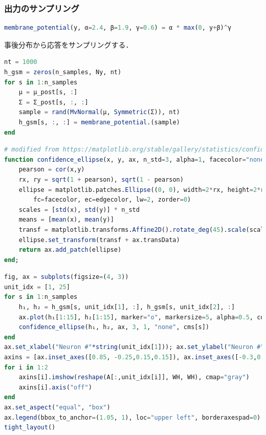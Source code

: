 \subsubsection{出力のサンプリング}
\begin{lstlisting}[language=julia]
membrane_potential(y, α=2.4, β=1.9, γ=0.6) = α * max(0, y+β)^γ
\end{lstlisting}
事後分布から応答をサンプリングする．
\begin{lstlisting}[language=julia]
nt = 1000
h_gsm = zeros(n_samples, Ny, nt)
for s in 1:n_samples
    μ = μ_post[s, :]
    Σ = Σ_post[s, :, :]
    sample = rand(MvNormal(μ, Symmetric(Σ)), nt)
    h_gsm[s, :, :] = membrane_potential.(sample)
end
\end{lstlisting}
\begin{lstlisting}[language=julia]
# modified from https://matplotlib.org/stable/gallery/statistics/confidence_ellipse.html
function confidence_ellipse(x, y, ax, n_std=3, alpha=1, facecolor="none", edgecolor="tab:gray")
    pearson = cor(x,y)
    rx, ry = sqrt(1 + pearson), sqrt(1 - pearson)
    ellipse = matplotlib.patches.Ellipse((0, 0), width=2*rx, height=2*ry, alpha=alpha, 
        fc=facecolor, ec=edgecolor, lw=2, zorder=0)
    scales = [std(x), std(y)] * n_std
    means = [mean(x), mean(y)]
    transf = matplotlib.transforms.Affine2D().rotate_deg(45).scale(scales...).translate(means...)
    ellipse.set_transform(transf + ax.transData)
    return ax.add_patch(ellipse)
end;
\end{lstlisting}
\begin{lstlisting}[language=julia]
fig, ax = subplots(figsize=(4, 3))
unit_idx = [1, 25]
for s in 1:n_samples
    h₁, h₂ = h_gsm[s, unit_idx[1], :], h_gsm[s, unit_idx[2], :]
    ax.plot(h₁[1:15], h₂[1:15], marker="o", markersize=5, alpha=0.5, color=cms[s], label=L"$z$ : "*string(Z[s]))
    confidence_ellipse(h₁, h₂, ax, 3, 1, "none", cms[s])
end
ax.set_xlabel("Neuron #"*string(unit_idx[1])); ax.set_ylabel("Neuron #"*string(unit_idx[2]))
axins = [ax.inset_axes([0.85, -0.25,0.15,0.15]), ax.inset_axes([-0.3,0.85,0.15,0.15])]
for i in 1:2
    axins[i].imshow(reshape(A[:,unit_idx[i]], WH, WH), cmap="gray")
    axins[i].axis("off")
end
ax.set_aspect("equal", "box")
ax.legend(bbox_to_anchor=(1.05, 1), loc="upper left", borderaxespad=0)
tight_layout()
\end{lstlisting}
